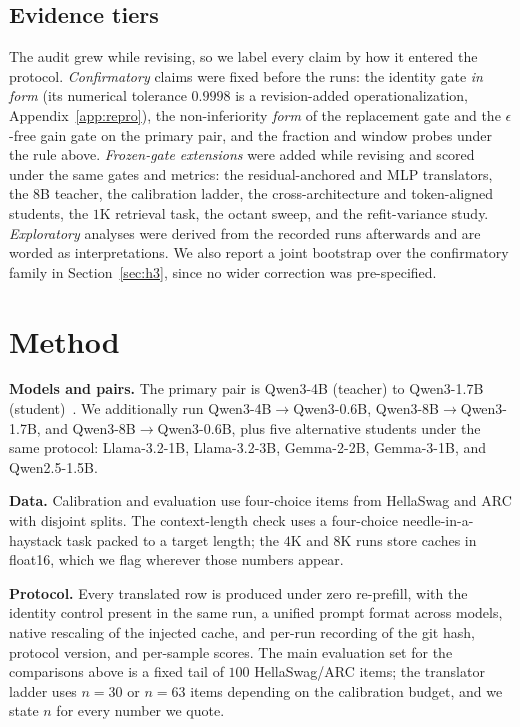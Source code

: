 \documentclass{article} %
\begin{document}
\subsection{Evidence tiers}
\label{sec:tiers}
The audit grew while revising, so we label every claim by how it entered the
protocol. \emph{Confirmatory} claims were fixed before the runs: the identity
gate \emph{in form} (its numerical tolerance $0.9998$ is a revision-added
operationalization, Appendix~\ref{app:repro}), the non-inferiority
\emph{form} of the replacement gate and the
$\epsilon$-free gain gate on the primary pair, and the fraction and window
probes under the rule above. \emph{Frozen-gate extensions} were added while
revising and scored under the same gates and metrics: the residual-anchored and
MLP translators, the $8$B teacher, the calibration ladder, the
cross-architecture and token-aligned students, the $1$K retrieval task, the
octant sweep, and the refit-variance study. \emph{Exploratory} analyses were
derived from the recorded runs afterwards and are worded as interpretations. We
also report a joint bootstrap over the confirmatory family in
Section~\ref{sec:h3}, since no wider correction was pre-specified.


\section{Method}
\label{sec:method}

\textbf{Models and pairs.} The primary pair is Qwen3-4B (teacher) to Qwen3-1.7B
(student)~\citep{qwen3}. We additionally run Qwen3-4B$\to$Qwen3-0.6B, Qwen3-8B$\to$Qwen3-1.7B,
and Qwen3-8B$\to$Qwen3-0.6B, plus five alternative students under the same
protocol: Llama-3.2-1B, Llama-3.2-3B, Gemma-2-2B, Gemma-3-1B, and Qwen2.5-1.5B.

\textbf{Data.} Calibration and evaluation use four-choice items from HellaSwag
and ARC with disjoint splits. The context-length check uses a four-choice
needle-in-a-haystack task packed to a target length; the $4$K and $8$K runs
store caches in float16, which we flag wherever those numbers appear.

\textbf{Protocol.} Every translated row is produced under zero re-prefill, with
the identity control present in the same run, a unified prompt format across
models, native rescaling of the injected cache, and per-run recording of the git
hash, protocol version, and per-sample scores. The main evaluation set for the
comparisons above is a fixed tail of $100$ HellaSwag/ARC items; the translator
ladder uses $n=30$ or $n=63$ items depending on the calibration budget, and we
state $n$ for every number we quote.
\end{document}
